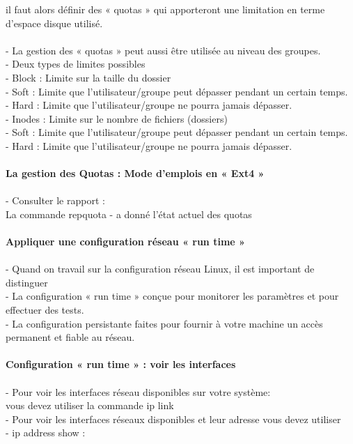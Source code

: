 \documentclass[10pt,a4paper]{article}
\begin{document}
il faut alors définir des « quotas » qui apporteront une limitation en terme d'espace disque utilisé.  \\\\
- La gestion des « quotas » peut aussi être utilisée au niveau des groupes. \\
- Deux types de limites possibles  \\
- Block : Limite sur la taille du dossier \\
- Soft : Limite que l'utilisateur/groupe peut dépasser pendant un certain temps.\\
- Hard : Limite que l'utilisateur/groupe ne pourra jamais dépasser. \\
- Inodes : Limite sur le nombre de fichiers (dossiers) \\
- Soft : Limite que l'utilisateur/groupe peut dépasser pendant un certain temps. \\
- Hard : Limite que l'utilisateur/groupe ne pourra jamais dépasser.\\\\
{\large\textbf{La gestion des Quotas : Mode d’emplois en « Ext4 »}}\\\\
- Consulter le rapport :\\
La commande repquota - a donné l'état actuel des quotas \\\\
{\large\textbf{Appliquer une configuration réseau « run time » }}\\\\
- Quand on travail sur la configuration réseau Linux, il est important de distinguer \\
- La configuration « run time » conçue pour monitorer les paramètres et pour effectuer des tests.  \\
- La configuration persistante faites pour fournir à votre machine un accès permanent et fiable au réseau. \\\\
{\large\textbf{Configuration « run time » : voir les interfaces }}\\\\
- Pour voir les interfaces réseau disponibles sur votre système: \\ 
vous devez utiliser la commande ip link \\
- Pour voir les interfaces réseaux disponibles et leur adresse vous devez utiliser \\
- ip address show : \\\\\\\\\\\\\\
\end{document}
